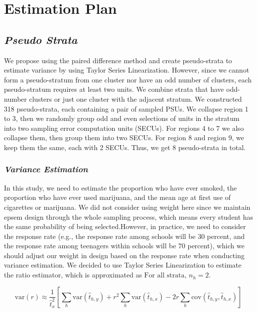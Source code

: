 \documentclass[
  12pt]{article}
\begin{document}
\section{Estimation Plan}\label{estimation-plan}

\subsection{\texorpdfstring{\emph{Pseudo
Strata}}{Pseudo Strata}}\label{pseudo-strata}

We propose using the paired difference method and create pseudo-strata
to estimate variance by using Taylor Series Linearization. However,
since we cannot form a pseudo-stratum from one cluster nor have an odd
number of clusters, each pseudo-stratum requires at least two units. We
combine strata that have odd-number clusters or just one cluster with
the adjacent stratum. We constructed 318 pseudo-strata, each containing
a pair of sampled PSUs. We collapse region 1 to 3, then we randomly
group odd and even selections of units in the stratum into two sampling
error computation units (SECUs). For regions 4 to 7 we also collapse
them, then group them into two SECUs. For region 8 and region 9, we keep
them the same, each with 2 SECUs. Thus, we get 8 pseudo-strata in total.

\subsubsection{\texorpdfstring{\emph{Variance
Estimation}}{Variance Estimation}}\label{variance-estimation}

In this study, we need to estimate the proportion who have ever smoked,
the proportion who have ever used marijuana, and the mean age at first
use of cigarettes or marijuana. We did not consider using weight here
since we maintain epsem design through the whole sampling process, which
means every student has the same probability of being selected.However,
in practice, we need to consider the response rate (e.g., the response
rate among schools will be 30 percent, and the response rate among
teenagers within schools will be 70 percent), which we should adjust our
weight in design based on the response rate when conducting variance
estimation. We decided to use Taylor Series Linearization to estimate
the ratio estimator, which is approximated as
\(\text{For all strata, } n_h = 2\).

\[
\text{var}(r) \approx \frac{1}{\hat{t}_x^2} \left[ \sum_h \text{var}(\hat{t}_{h,y}) + r^2 \sum_h \text{var}(\hat{t}_{h,x}) - 2r \sum_h \text{cov}(\hat{t}_{h,y}, \hat{t}_{h,x}) \right]
\]
\end{document}
